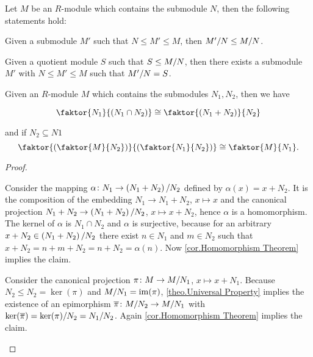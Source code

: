 \begin{cor}
Let $M$ be an $R$-module which contains the submodule $N$, then the following statements hold:
\begin{thmlist}
\item Given a submodule $M'$ such that $N\leq M'\leq M$, then $\nicefrac{M'}{N}\leq\MtN$.
\item Given a quotient module $S$ such that $S\leq\MtN$, then there exists a submodule $M'$ with $N\leq M'\leq M$ such that $\nicefrac{M'}{N}=S$.
\end{thmlist}
\end{cor}

\begin{cor}
Given an $R$-module $M$ which contains the submodules $N_1,N_2$, then we have
\begin{thmlist}
\item $$\faktor{N_1}{\left(N_1\cap N_2\right)}\cong\faktor{\left(N_1+N_2\right)}{N_2}$$
\item and if $N_2\subseteq N1$ $$\faktor{\left(\faktor{M}{N_2}\right)}{\left(\faktor{N_1}{N_2}\right)}\cong\faktor{M}{N_1}.$$
\end{thmlist}
\end{cor}
\begin{proof}
\begin{plist}
\item Consider the mapping $\alpha\colon N_1\to \nicefrac{\left(N_1+N_2\right)}{N_2}$ def\-ined by $\alpha(x)=x+N_2$. It is the composition of the embedding $N_1\to N_1+N_2$, $x\mapsto x$ and the canonical projection $N_1+N_2\to\nicefrac{\left(N_1+N_2\right)}{N_2}$, $x\mapsto x+N_2$, hence $\alpha$ is a homomorphism. The kernel of $\alpha$ is $N_1\cap N_2$ and $\alpha$ is surjective, because for an arbitrary $x+N_2\in\nicefrac{\left(N_1+N_2\right)}{N_2}$ there exist $n\in N_1$ and $m\in N_2$ such that $x+N_2=n+m+N_2=n+N_2=\alpha(n)$. Now \cref{cor.Homomorphism Theorem} implies the claim. 
\item Consider the canonical projection $\pi\colon M\to \nicefrac{M}{N_1}$, $x\mapsto x+N_1$. Because $N_2\leq N_2=\ker(\pi)$ and $\nicefrac{M}{N_1}=\im(\pi)$, \cref{theo.Universal Property} implies the existence of an epimorphism $\overline{\pi}\colon \nicefrac{M}{N_2}\to\nicefrac{M}{N_1}$ with $\ker(\overline{\pi})=\nicefrac{\ker(\pi)}{N_2}=\nicefrac{N_1}{N_2}$. Again \cref{cor.Homomorphism Theorem} implies the claim.
\end{plist}
\end{proof}
